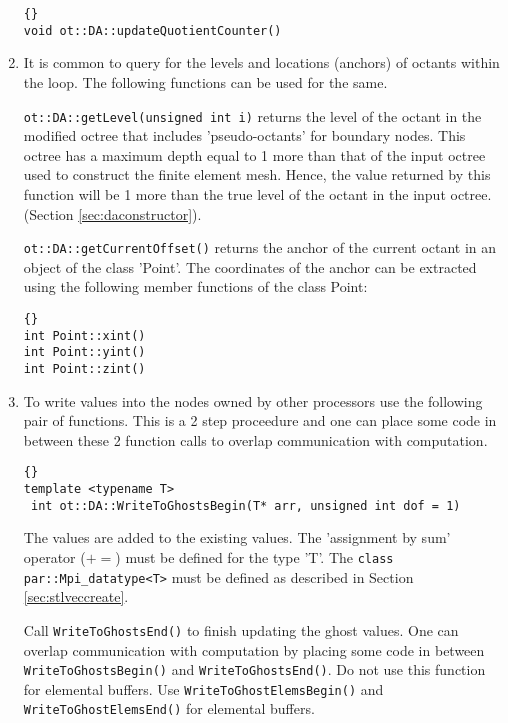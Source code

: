 \documentclass[10pt,reqno,a4paper]{report}
\numberwithin{equation}{section}
\begin{document}
\begin{enumerate}
\begin{lstlisting}[frame=trbl, fontadjust]{}
void ot::DA::updateQuotientCounter()
\end{lstlisting}

\item It is common to query for the levels and locations (anchors) of octants within the loop. The following functions can be used for the same.

\lstinline[basicstyle=\bfseries]!ot::DA::getLevel(unsigned int i)! returns the level of the octant in the modified octree that includes
 'pseudo-octants' for boundary nodes. This octree has a maximum depth equal to 1 more than that of the input octree used to construct the finite element mesh. Hence, the value returned by this function will be 1 more than the true level of the octant in the input octree. (Section \ref{sec:daconstructor}).

\lstinline[basicstyle=\bfseries]!ot::DA::getCurrentOffset()! returns the anchor of the current octant in an object of the class 'Point'. The coordinates of the anchor can be extracted using the following member functions of the class Point:

\begin{lstlisting}[frame=trbl, fontadjust]{}
int Point::xint()
int Point::yint()
int Point::zint()
\end{lstlisting}

\item To write values into the nodes owned by other processors use the following pair of functions. This is a 2 step proceedure
 and one can place some code in between these 2 function calls to overlap communication with computation. 
 
\begin{lstlisting}[frame=trbl, fontadjust]{}
template <typename T>
 int ot::DA::WriteToGhostsBegin(T* arr, unsigned int dof = 1)
\end{lstlisting}

The values are added to the existing values. The 'assignment by sum' operator ($+=$) must be defined for the type 'T'. The 
\lstinline[basicstyle=\bfseries]!class par::Mpi_datatype<T>! must be defined as described in Section \ref{sec:stlveccreate}.

Call \lstinline[basicstyle=\bfseries]!WriteToGhostsEnd()! to finish updating the ghost values.
 One can overlap communication with computation by placing
 some code in between \lstinline[basicstyle=\bfseries]!WriteToGhostsBegin()! and \lstinline[basicstyle=\bfseries]!WriteToGhostsEnd()!.
 Do not use this function for elemental buffers. Use \lstinline[basicstyle=\bfseries]!WriteToGhostElemsBegin()! and \lstinline[basicstyle=\bfseries]!WriteToGhostElemsEnd()! for elemental buffers.


\end{enumerate}
\end{document}
